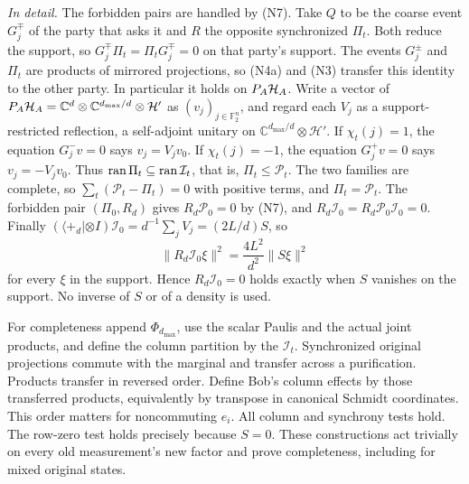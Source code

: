 \emph{In detail.} The forbidden pairs are handled by (N7). Take $Q$ to be the coarse event $G^\mp_j$ of the party that asks it and $R$ the opposite synchronized $\Pi_t$. Both reduce the support, so $G^\mp_j\Pi_t=\Pi_tG^\mp_j=0$ on that party's support. The events $G^\pm_j$ and $\Pi_t$ are products of mirrored projections, so (N4a) and (N3) transfer this identity to the other party. In particular it holds on $P_A\mathcal H_A$. Write a vector of $P_A\mathcal H_A=\mathbb C^d\otimes\mathbb C^{d_{\max}/d}\otimes\mathcal H'$ as $(v_j)_{j\in\mathbb F_2^n}$, and regard each $V_j$ as a support-restricted reflection, a self-adjoint unitary on $\mathbb C^{d_{\max}/d}\otimes\mathcal H'$. If $\chi_t(j)=1$, the equation $G^-_jv=0$ says $v_j=V_jv_0$. If $\chi_t(j)=-1$, the equation $G^+_jv=0$ says $v_j=-V_jv_0$. Thus $\operatorname{ran}\Pi_t\subseteq\operatorname{ran}\mathcal I_t$, that is, $\Pi_t\leq\mathcal P_t$. The two families are complete, so $\sum_t(\mathcal P_t-\Pi_t)=0$ with positive terms, and $\Pi_t=\mathcal P_t$. The forbidden pair $(\Pi_0,R_d)$ gives $R_d\mathcal P_0=0$ by (N7), and $R_d\mathcal I_0=R_d\mathcal P_0\mathcal I_0=0$. Finally $(\langle+_d|\otimes I)\mathcal I_0=d^{-1}\sum_jV_j=(2L/d)S$, so
\[
 \|R_d\mathcal I_0\xi\|^2=\frac{4L^2}{d^2}\|S\xi\|^2
\]
for every $\xi$ in the support. Hence $R_d\mathcal I_0=0$ holds exactly when $S$ vanishes on the support. No inverse of $S$ or of a density is used.

For completeness append $\Phi_{d_{\max}}$, use the scalar Paulis and the actual joint products, and define the column partition by the $\mathcal I_t$. Synchronized original projections commute with the marginal and transfer across a purification. Products transfer in reversed order. Define Bob's column effects by those transferred products, equivalently by transpose in canonical Schmidt coordinates. This order matters for noncommuting $e_i$. All column and synchrony tests hold. The row-zero test holds precisely because $S=0$. These constructions act trivially on every old measurement's new factor and prove completeness, including for mixed original states.

